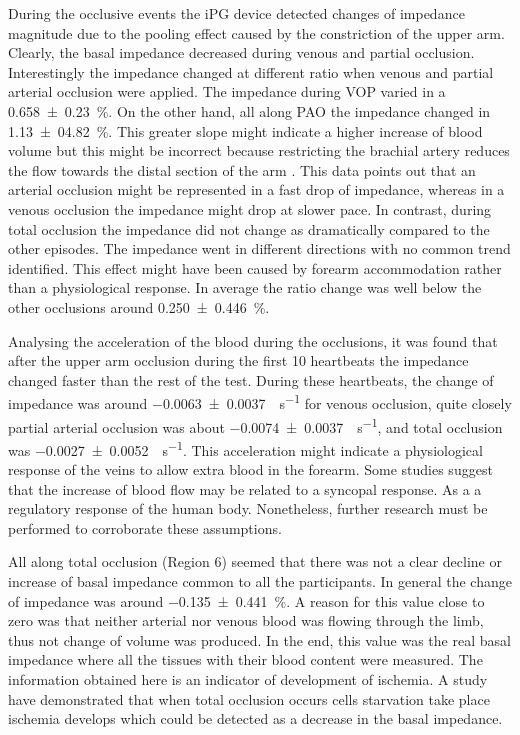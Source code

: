 During the occlusive events the iPG device detected changes of impedance magnitude due to the pooling effect caused by the constriction of the upper arm. Clearly, the basal impedance decreased during venous and partial occlusion. Interestingly the impedance changed at different ratio when venous and partial arterial occlusion were applied. The impedance during VOP varied in a \SI{0.658(0230)}{\percent}. On the other hand, all along PAO the impedance changed in \SI{1.13(0482)}{\percent}. This greater slope might indicate a higher increase of blood volume but this might be incorrect because restricting the brachial artery reduces the flow towards the distal section of the arm \cite{mccully2004muscle}. This data points out that an arterial occlusion might be represented in a fast drop of impedance, whereas in a venous occlusion the impedance might drop at slower pace. In contrast, during total occlusion the impedance did not change as dramatically compared to the other episodes. The impedance went in different directions with no common trend identified. This effect might have been caused by forearm accommodation rather than a physiological response. In average the ratio change was well below the other occlusions around \SI{0.250(0446)}{\percent}. 

Analysing the acceleration of the blood during the occlusions, it was found that after the upper arm occlusion during the first 10 heartbeats the impedance changed faster than the rest of the test. During these heartbeats, the change of impedance was around \SI{-0.0063(00037)}{\Omega \per \second} for venous occlusion, quite closely partial arterial occlusion was about \SI{-0.0074(00037)}{\Omega \per \second}, and total occlusion was \SI{-0.0027(00052)}{\Omega \per \second}. This acceleration might indicate a physiological response of the veins to allow extra blood in the forearm. Some studies \cite{joyner2001belfast, hainsworth2003syncope} suggest that the increase of blood flow may be related to a syncopal response. As a a regulatory response of the human body. Nonetheless, further research must be performed to corroborate these assumptions. 

All along total occlusion (Region 6) seemed that there was not a clear decline or increase of basal impedance common to all the participants. In general the change of impedance was around \SI{-0.135(0441)}{\percent}. A reason for this value close to zero was that neither arterial nor venous blood was flowing through the limb, thus not change of volume was produced. In the end, this value was the real basal impedance where all the tissues with their blood content were measured. The information obtained here is an indicator of development of ischemia. A study have demonstrated that when total occlusion occurs cells starvation take place ischemia develops \cite{ristic1997muscle} which could be detected as a decrease in the basal impedance. 


